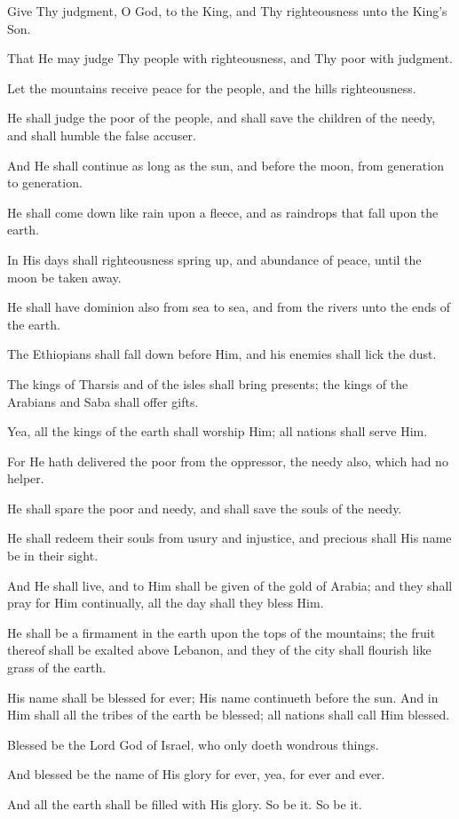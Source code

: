 Give Thy judgment, O God, to the King, and Thy righteousness unto the King's Son.

That He may judge Thy people with righteousness, and Thy poor with judgment.

Let the mountains receive peace for the people, and the hills righteousness.

He shall judge the poor of the people, and shall save the children of the needy, and shall humble the false accuser.

And He shall continue as long as the sun, and before the moon, from generation to generation.

He shall come down like rain upon a fleece, and as raindrops that fall upon the earth.

In His days shall righteousness spring up, and abundance of peace, until the moon be taken away.

He shall have dominion also from sea to sea, and from the rivers unto the ends of the earth.

The Ethiopians shall fall down before Him, and his enemies shall lick the dust.

The kings of Tharsis and of the isles shall bring presents; the kings of the Arabians and Saba shall offer gifts.

Yea, all the kings of the earth shall worship Him; all nations shall serve Him.

For He hath delivered the poor from the oppressor, the needy also, which had no helper.

He shall spare the poor and needy, and shall save the souls of the needy.

He shall redeem their souls from usury and injustice, and precious shall His name be in their sight.

And He shall live, and to Him shall be given of the gold of Arabia; and they shall pray for Him continually, all the day shall they bless Him.

He shall be a firmament in the earth upon the tops of the mountains; the fruit thereof shall be exalted above Lebanon, and they of the city shall flourish like grass of the earth.

His name shall be blessed for ever; His name continueth before the sun. And in Him shall all the tribes of the earth be blessed; all nations shall call Him blessed.

Blessed be the Lord God of Israel, who only doeth wondrous things.

And blessed be the name of His glory for ever, yea, for ever and ever.

And all the earth shall be filled with His glory. So be it. So be it.
